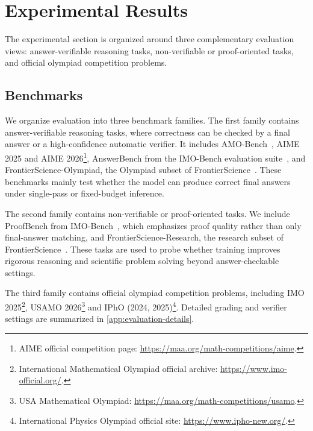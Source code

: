 \section{Experimental Results}
\label{sec:exp-results}
The experimental section is organized around three complementary evaluation
views: answer-verifiable reasoning tasks, non-verifiable or proof-oriented
tasks, and official olympiad competition problems. 

\subsection{Benchmarks}

We organize evaluation into three benchmark families. The first family contains
answer-verifiable reasoning tasks, where correctness can be checked by a final
answer or a high-confidence automatic verifier. It includes AMO-Bench~\citep{an2025amobench},
AIME 2025 and AIME 2026\footnote{AIME official competition page:
\url{https://maa.org/math-competitions/aime}.}, AnswerBench from the
IMO-Bench evaluation suite~\citep{luong2025imobench}, and FrontierScience-Olympiad,
the Olympiad subset of FrontierScience~\citep{wang2026frontierscience}. These
benchmarks mainly test whether the model can produce correct final answers
under single-pass or fixed-budget inference.

The second family contains non-verifiable or proof-oriented tasks. We include
ProofBench from IMO-Bench~\citep{luong2025imobench}, which emphasizes proof
quality rather than only final-answer matching, and FrontierScience-Research, the
research subset of FrontierScience~\citep{wang2026frontierscience}. These tasks
are used to probe whether training improves rigorous reasoning and scientific
problem solving beyond answer-checkable settings.

The third family contains official olympiad competition problems, including
IMO 2025\footnote{International Mathematical Olympiad official archive:
\url{https://www.imo-official.org/}.}, USAMO 2026\footnote{USA
Mathematical Olympiad:
\url{https://maa.org/math-competitions/usamo}.} and IPhO (2024, 2025)\footnote{International Physics
Olympiad official site: \url{https://www.ipho-new.org/}.}. 
Detailed grading and verifier settings are summarized
in \cref{app:evaluation-details}.


